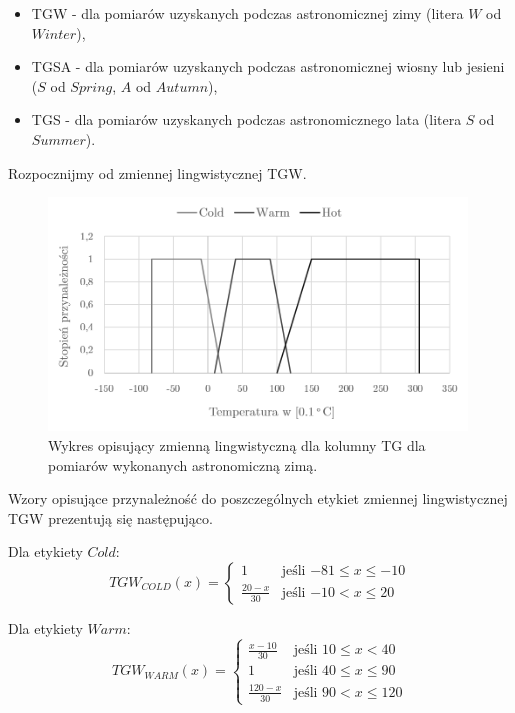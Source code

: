 \documentclass{classrep}
\begin{document}
\begin{itemize}[label=$\bullet$\scshape\bfseries]
\item TGW - dla pomiarów uzyskanych podczas astronomicznej zimy (litera $W$ od $Winter$),
\item TGSA - dla pomiarów uzyskanych podczas astronomicznej wiosny lub jesieni ($S$ od $Spring$, $A$ od $Autumn$),
\item TGS - dla pomiarów uzyskanych podczas astronomicznego lata (litera $S$ od $Summer$).\newline\newline
\end{itemize}

Rozpocznijmy od zmiennej lingwistycznej TGW.
\begin{figure}[H]
	\centering
	\includegraphics[width=0.99\textwidth]{Pictures/TermsCharts/TG_Z.png}
	\caption{Wykres opisujący zmienną lingwistyczną dla kolumny TG dla pomiarów wykonanych astronomiczną zimą.}
\end{figure}

Wzory opisujące przynależność do poszczególnych etykiet zmiennej lingwistycznej TGW prezentują się następująco. \newline

Dla etykiety $Cold$:
\begin{equation}
{TGW}_{COLD}(x)= \left\{ \begin{array}{ll}
1 			& \textrm{jeśli $-81 \leq x \leq -10$} \\
\frac{20-x}{30} 	& \textrm{jeśli $-10 < x \leq 20$}
\end{array} \right.
\end{equation}

Dla etykiety $Warm$:
\begin{equation}
{TGW}_{WARM}(x)= \left\{ \begin{array}{ll}
\frac{x-10}{30} 	 & \textrm{jeśli $10 \leq x < 40$} \\
1 			 & \textrm{jeśli $40 \leq x \leq 90$} \\
\frac{120-x}{30} & \textrm{jeśli $90 < x \leq 120$}
\end{array} \right.
\end{equation}
\end{document}
